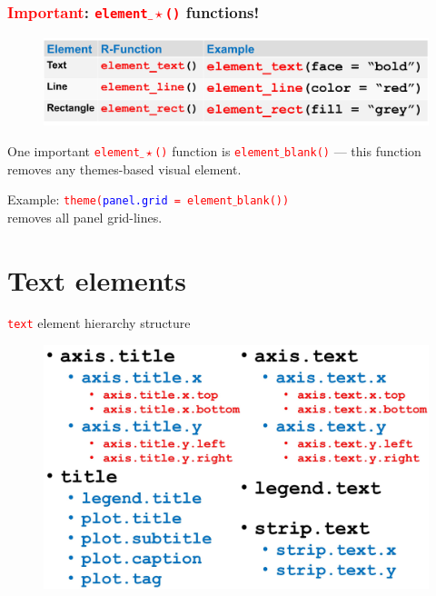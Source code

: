 \documentclass{beamer}
\begin{document}
\begin{frame}\frametitle{\textbf{\textcolor{red}{Important}}: \texttt{\textcolor{red}{element$\_\star$()}} functions!}
\begin{figure}
\includegraphics[width=0.99\linewidth]{PlotsLec3/ElementFunctions2}
\end{figure}
One important \texttt{\textcolor{red}{element$\_\star$()}} function is \texttt{\textcolor{red}{element$\_$blank()}} --- this function removes any themes-based visual element.

Example: \texttt{\textcolor{red}{theme(\textcolor{blue}{panel.grid} = element$\_$blank())}} \\
removes all panel grid-lines.
\end{frame}

\section{Text elements}
\begin{frame}{\texttt{\textcolor{red}{text}} element hierarchy structure}
\begin{figure}
\includegraphics[width=0.99\linewidth]{PlotsLec3/TextThemeElements2}
\end{figure}
\end{frame}
\end{document}
